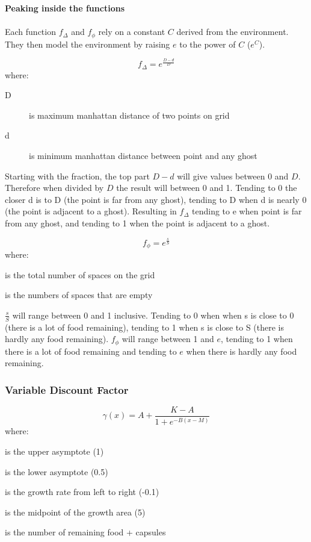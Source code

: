 \documentclass[letterpaper, 11pt, journal, final]{IEEEtran}
\begin{document}
\textbf{Peaking inside the functions}\\\\
Each function \(f_\Delta\) and \(f_\phi\) rely on a constant \(C\) derived from the environment. They then model the environment by raising \(e\) to the power of \(C\) (\(e^C\)).

\[f_\Delta= e^{\frac{D - d}{D}}\]
where:
\begin{description}
\item[D] is maximum manhattan distance of two points on grid
\item[d] is minimum manhattan distance between point and any ghost
\end{description}
Starting with the fraction, the top part \(D - d\) will give values between 0 and \(D\). Therefore when divided by \(D\) the result will between 0 and 1. Tending to 0 the closer d is to D (the point is far from any ghost), tending to D when d is nearly 0 (the point is adjacent to a ghost). Resulting in \(f_\Delta\) tending to e when point is far from any ghost, and tending to 1 when the point is adjacent to a ghost.


\[f_\phi= e^{\frac{s}{S}}\]
where:
\begin{description}
\item[S] is the total number of spaces on the grid
\item[s] is the numbers of spaces that are empty
\item
\end{description}

\(\frac{s}{S}\) will range between 0 and 1 inclusive. Tending to 0 when when s is close to 0 (there is a lot of food remaining), tending to 1 when s is close to S (there is hardly any food remaining). \(f_\phi\) will range between 1 and \(e\), tending to 1 when there is a lot of food remaining and tending to \(e\) when there is hardly any food remaining.

\subsubsection{Variable Discount Factor}
\[\gamma(x) = A + \frac{K - A}{1 + e^{-B(x-M)}}\]
where:
\begin{description}
\item[K] is the upper asymptote (1)
\item[A] is the lower asymptote (0.5)
\item[B] is the growth rate from left to right (-0.1)
\item[M] is the midpoint of the growth area (5)
\item[\(x\)] is the number of remaining food + capsules
\item
\end{description}
\end{document}
